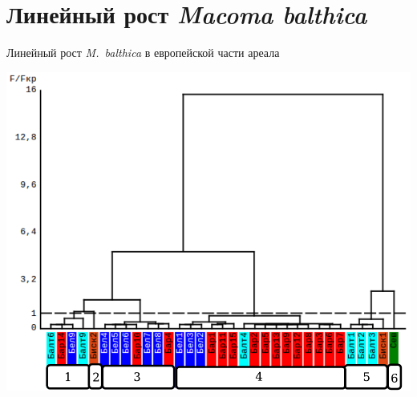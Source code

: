 \documentclass{beamer}
\begin{document}
		\section[Линейный рост]{Линейный рост {\it Macoma balthica}}
\begin{frame}{Линейный рост {\it M.~balthica} в европейской части ареала}
	\begin{minipage}[t]{.52\linewidth}
		\begin{center}
			\includegraphics[width=\textwidth]{./Europe_clusters_usrednenie.pdf}
		\end{center}


\end{minipage}
\end{frame}
\end{document}
